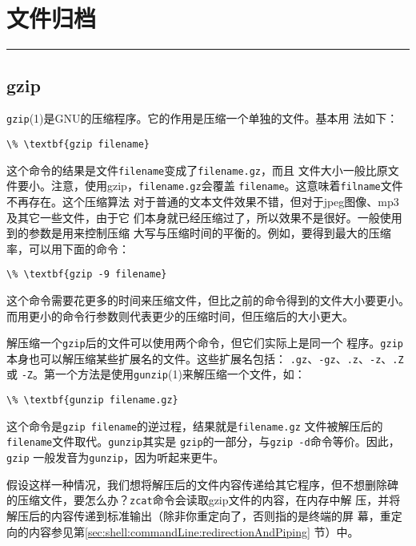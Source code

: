 
\chapter{文件归档}
\label{chap:archiveFiles}

\rule{\textwidth}{0.1pt}

\section{gzip}
\label{sec:archiveFiles:gzip}

\texttt{gzip}(1)是GNU的压缩程序。它的作用是压缩一个单独的文件。基本用
法如下：
\begin{Verbatim}[frame=single, commandchars=\\\{\}]
\% \textbf{gzip filename}
\end{Verbatim}

这个命令的结果是文件\texttt{filename}变成了\texttt{filename.gz}，而且
文件大小一般比原文件要小。注意，使用gzip，\texttt{filename.gz}会覆盖
\texttt{filename}。这意味着\texttt{filname}文件不再存在。这个压缩算法
对于普通的文本文件效果不错，但对于jpeg图像、mp3及其它一些文件，由于它
们本身就已经压缩过了，所以效果不是很好。一般使用到的参数是用来控制压缩
大写与压缩时间的平衡的。例如，要得到最大的压缩率，可以用下面的命令：
\begin{Verbatim}[frame=single, commandchars=\\\{\}]
\% \textbf{gzip -9 filename}
\end{Verbatim}
这个命令需要花更多的时间来压缩文件，但比之前的命令得到的文件大小要更小。
而用更小的命令行参数则代表更少的压缩时间，但压缩后的大小更大。

解压缩一个\texttt{gzip}后的文件可以使用两个命令，但它们实际上是同一个
程序。\texttt{gzip}本身也可以解压缩某些扩展名的文件。这些扩展名包括：
\texttt{.gz}、\texttt{-gz}、\texttt{.z}、\texttt{-z}、\texttt{.Z}或
\texttt{-Z}。第一个方法是使用\texttt{gunzip}(1)来解压缩一个文件，如：
\begin{Verbatim}[frame=single, commandchars=\\\{\}]
\% \textbf{gunzip filename.gz}
\end{Verbatim}
这个命令是\texttt{gzip filename}的逆过程，结果就是\texttt{filename.gz}
文件被解压后的\texttt{filename}文件取代。\texttt{gunzip}其实是
\texttt{gzip}的一部分，与\texttt{gzip -d}命令等价。因此，\texttt{gzip}
一般发音为\texttt{gunzip}，因为听起来更牛。

假设这样一种情况，我们想将解压后的文件内容传递给其它程序，但不想删除碑
的压缩文件，要怎么办？\texttt{zcat}命令会读取gzip文件的内容，在内存中解
压，并将解压后的内容传递到标准输出（除非你重定向了，否则指的是终端的屏
幕，重定向的内容参见第\ref{sec:shell:commandLine:redirectionAndPiping}
节）中。

